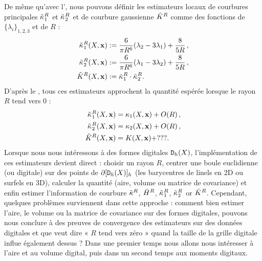%
De même qu'avec l', nous pouvons définir
les estimateurs locaux de courbures principales $\tilde{\kappa_{}}_{1}^{R}$ et
$\tilde{\kappa_{}}_{2}^{R}$ et de courbure gaussienne $\tilde{K}^{R}$ comme des
fonctions de $\{\lambda_i\}_{1,2,3}$ et de $R$ :
%
\begin{align}
  \label{eq:pottmann-3d-princ}
  \tilde{\kappa_{}}_{1}^{R}(X,\mathbf{x})& := \frac{6}{\pi R^6}(\lambda_2 - 3\lambda_1) + \frac{8}{5R}\,,\\
  \tilde{\kappa_{}}_{2}^{R}(X,\mathbf{x})& := \frac{6}{\pi R^6}(\lambda_1 - 3\lambda_2) + \frac{8}{5R}\,,\\
  \tilde{K}^{R}(X,\mathbf{x})& := \tilde{\kappa_{}}_{1}^{R} \cdot \tilde{\kappa_{}}_{2}^{R}.
\end{align}
%
D'après le , tous ces estimateurs approchent la
quantité espérée lorsque le rayon $R$ tend vers $0$ :
%
\begin{align}
  \label{eq:pottmann-3d-princ}
  \tilde{\kappa_{}}_{1}^{R}(X,\mathbf{x})& = \kappa_{1}(X,\mathbf{x}) + O(R)\,,\\
  \tilde{\kappa_{}}_{2}^{R}(X,\mathbf{x})& = \kappa_{2}(X,\mathbf{x}) + O(R)\,,\\
  \tilde{K}^{R}(X,\mathbf{x})& = K(X,\mathbf{x}) + ???.
\end{align}
%
Lorsque nous nous intéressons à des formes digitales $\mathtt{D}_{h}(X)$, l'implémentation
de ces estimateurs devient direct : choisir un rayon $R$, centrer une boule
euclidienne (ou digitale) sur des points de $\partial \lbrack \mathtt{D}_{h}(X) \rbrack_{h}$
(\cad les barycentres de linels en 2D ou surfels en 3D), calculer la quantité (aire, volume ou matrice de covariance) et
enfin estimer l'information de courbure $\tilde{\kappa}^{R}$, $\tilde{H}^{R}$,
$\tilde{\kappa_{}}_{1}^{R}$, $\tilde{\kappa_{}}_{2}^{R}$ or $\tilde{K}^{R}$.
%
Cependant, quelques problèmes surviennent dans cette approche : comment bien
estimer l'aire, le volume ou la matrice de covariance sur des formes digitales,
pouvons nous conclure à des preuves de convergence des estimateurs sur des
données digitales et que veut dire « $R$ tend vers zéro » quand la taille de la
grille digitale influe également dessus ? Dans une premier temps nous allons
nous intéresser à l'aire et au volume digital, puis dans un second temps aux
moments digitaux.
%
